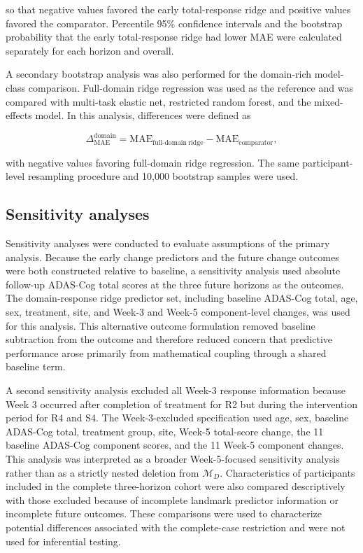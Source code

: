 \documentclass[11pt]{article}
\begin{document}
so that negative values favored the early total-response ridge and positive values favored
the comparator. Percentile 95\% confidence intervals and the bootstrap probability that the
early total-response ridge had lower MAE were calculated separately for each horizon and
overall.

A secondary bootstrap analysis was also performed for the domain-rich model-class comparison.
Full-domain ridge regression was used as the reference and was compared with multi-task
elastic net, restricted random forest, and the mixed-effects model. In this analysis,
differences were defined as

\begin{equation}
\Delta_{\mathrm{MAE}}^{\mathrm{domain}}
=
\mathrm{MAE}_{\mathrm{full\mbox{-}domain\ ridge}}
-
\mathrm{MAE}_{\mathrm{comparator}},
\end{equation}

with negative values favoring full-domain ridge regression. The same participant-level
resampling procedure and 10,000 bootstrap samples were used.


\subsection{Sensitivity analyses}

Sensitivity analyses were conducted to evaluate assumptions of the primary analysis. Because the early change predictors and the future change outcomes were both constructed
relative to baseline, a sensitivity analysis used absolute follow-up ADAS-Cog total scores
at the three future horizons as the outcomes. The domain-response ridge predictor set,
including baseline ADAS-Cog total, age, sex, treatment, site, and Week-3 and Week-5
component-level changes, was used for this analysis. This alternative outcome formulation
removed baseline subtraction from the outcome and therefore reduced concern that predictive
performance arose primarily from mathematical coupling through a shared baseline term.

A second sensitivity analysis excluded all Week-3 response information because Week 3
occurred after completion of treatment for R2 but during the intervention period for R4
and S4. The Week-3-excluded specification used age, sex, baseline ADAS-Cog total,
treatment group, site, Week-5 total-score change, the 11 baseline ADAS-Cog component scores,
and the 11 Week-5 component changes. This analysis was interpreted as a broader
Week-5-focused sensitivity analysis rather than as a strictly nested deletion from
$\mathcal{M}_{D}$. Characteristics of participants included in the complete three-horizon cohort were also
compared descriptively with those excluded because of incomplete landmark predictor
information or incomplete future outcomes. These comparisons were used to characterize
potential differences associated with the complete-case restriction and were not used
for inferential testing.
\end{document}
